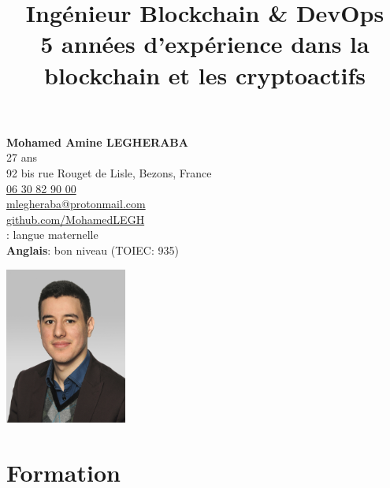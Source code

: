 \documentclass[10pt]{article}
\title{\bfseries{\huge{Ingénieur Blockchain \& DevOps}}\\[0.75cm] \Large{5 années d'expérience dans la blockchain et les cryptoactifs}}
\author{\bfseries\Huge \vspace{-4ex}}
\date{}
\begin{document}
\begin{minipage}[t]{0.80\textwidth}
\textbf{\Large{Mohamed Amine LEGHERABA}}\\
\vspace{4ex}27 ans\\
92 bis rue Rouget de Lisle, Bezons, France\\
\href{tel:0630829000}{06 30 82 90 00}\\
\href{mailto:mlegheraba@protonmail.com}{mlegheraba@protonmail.com}\\
\href{https://github.com/MohamedLEGH}{github.com/MohamedLEGH}\\
\vspace{5ex}{\bf Français}: langue maternelle \\
{\bf Anglais}: bon niveau (TOIEC: 935) \\
\end{minipage}
\begin{minipage}[t]{0.20\textwidth}
\vspace{-3ex}
\includegraphics[width=4cm]{figures/Legheraba-Mohamed.jpg}
\end{minipage}
{\let\newpage\relax\maketitle}
\thispagestyle{empty}

\vspace{-10ex}

\section*{Formation}

\vspace{2ex}
\end{document}
